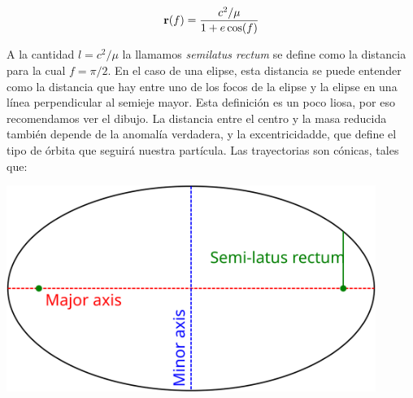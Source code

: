 \begin{equation}
	\mathbf{r}(f) = \frac{c^2/\mu}{1+e\cos(f)}
\end{equation}
\hspace{-0.0mm} \vspace{1.0mm} \begin{minipage}{0.55\textwidth}
	A  la cantidad $l=c^2/\mu$ la llamamos \textit{semilatus rectum} se define como la distancia para la cual $f=\pi/2$. En el caso de una elipse, esta distancia se puede entender como la distancia que hay entre uno de los focos de la elipse y la elipse en una línea perpendicular al semieje mayor. Esta definición es un poco liosa, por eso recomendamos ver el dibujo. La distancia entre el centro y la masa reducida también depende de la anomalía verdadera, y la excentricidadde, que define el tipo de órbita que seguirá nuestra partícula. Las trayectorias son cónicas, tales que:
\end{minipage}	\hfill
\begin{minipage}{0.45\textwidth} 
	\begin{center}
	\includegraphics[width=0.9\textwidth]{Cuerpo/Ch_02/02_Semilatus_rectum.png}
	\end{center}
\end{minipage}


